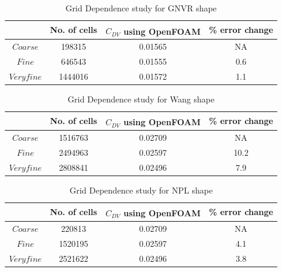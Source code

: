 \begin{table}[H]
	\caption{Grid Dependence study for GNVR shape}
	\label{GridindependenceGNVR} %
	\centering
	\begin{tabular}{ c c c c }
		\hline \hline
		& No. of cells & $C_{DV}$ using OpenFOAM\textsuperscript{\textregistered} & \% error change   \\ \hline \hline
		$ Coarse  $ & 198315  & 0.01565 & NA    \\  
		$ Fine $ & 646543  & 0.01555 & 0.6    \\  
		$ Very fine $ & 1444016  & 0.01572 & 1.1    \\ \hline	
	\end{tabular}
	
\end{table}

\begin{table}[H]
	\caption{Grid Dependence study for Wang shape}
	\label{Grid independence study for Wang profile} %
	\centering
	\begin{tabular}{  c c c c  }
		\hline \hline
		& No. of cells & $C_{DV}$ using OpenFOAM\textsuperscript{\textregistered} & \% error change \\ \hline \hline
		$ Coarse  $ & 1516763 & 0.02709  & NA    \\  
		$ Fine $ & 2494963 & 0.02597  & 10.2    \\  
		$ Very fine $ & 2808841 & 0.02496  & 7.9    \\  \hline	
	\end{tabular}
	
\end{table}


\begin{table}[H]
	\caption{Grid Dependence study for NPL shape}
	\label{Grid independence study for NPL profile} %
	\centering
	\begin{tabular}{  c  c c c }
		\hline \hline
		& No. of cells & $C_{DV}$ using OpenFOAM\textsuperscript{\textregistered} & \% error change \\ \hline \hline
		$ Coarse  $ & 220813 & 0.02709  & NA    \\  
		$ Fine $ & 1520195 & 0.02597  & 4.1    \\  
		$ Very fine $ & 2521622 & 0.02496  & 3.8    \\  \hline
	\end{tabular}
	
\end{table}



